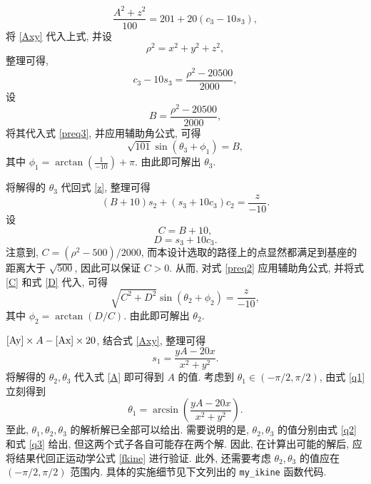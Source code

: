 \documentclass{article}
\begin{document}
\begin{equation}
    \frac{A^2+z^2}{100} = 201 + 20 (c_3 - 10s_3),
\end{equation}
将 \eqref{Axy} 代入上式, 并设
\begin{equation}
    \label{rho}
    \rho^2 = x^2 + y^2 + z^2,
\end{equation}
整理可得,
\begin{equation}
    \label{preq3}
    c_3 - 10s_3 = \frac{\rho^2 - 20500}{2000},
\end{equation}
设
\begin{equation}
    \label{B}
    B = \frac{\rho^2 - 20500}{2000},
\end{equation}
将其代入式 \eqref{preq3}, 并应用辅助角公式, 可得
\begin{equation}
    \label{q3}
    \sqrt{101}\sin(\theta_3 + \phi_1) = B,
\end{equation}
其中 $\phi_1 = \arctan(\frac{1}{-10}) + \pi$. 由此即可解出 $\theta_3$.\par
将解得的 $\theta_3$ 代回式 \eqref{z}, 整理可得
\begin{equation}
    \label{preq2}
    (B+10)s_2 + (s_3+10c_3)c_2 = \frac{z}{-10}.
\end{equation}
设
\begin{equation}
    \label{C}
    C = B + 10,
\end{equation}
\begin{equation}
    \label{D}
    D = s_3+10c_3.
\end{equation}
注意到, $C = (\rho^2 - 500)/2000$, 而本设计选取的路径上的点显然都满足到基座的距离大于 $\sqrt{500}$, 因此可以保证 $C > 0$. 从而, 对式 \eqref{preq2} 应用辅助角公式, 并将式 \eqref{C} 和式 \eqref{D} 代入, 可得
\begin{equation}
    \label{q2}
    \sqrt{C^2+D^2} \sin(\theta_2 + \phi_2) = \frac{z}{-10},
\end{equation}
其中 $\phi_2 = \arctan(D/C)$. 由此即可解出 $\theta_2$.\par
$\eqref{Ay} \times A - \eqref{Ax} \times 20$, 结合式 \eqref{Axy}, 整理可得
\begin{equation}
    \label{q1}
    s_1 = \frac{yA - 20x}{x^2+y^2}.
\end{equation}
将解得的 $\theta_2,\theta_3$ 代入式 \eqref{A} 即可得到 $A$ 的值. 考虑到 $\theta_1 \in (-\pi/2, \pi/2)$, 由式 \eqref{q1} 立刻得到
\begin{equation}
    \label{solvedq1}
    \theta_1 = \arcsin(\frac{yA - 20x}{x^2+y^2}).
\end{equation}
至此, $\theta_1,\theta_2,\theta_3$ 的解析解已全部可以给出. 需要说明的是, $\theta_2,\theta_3$ 的值分别由式 \eqref{q2} 和式 \eqref{q3} 给出, 但这两个式子各自可能存在两个解. 因此, 在计算出可能的解后, 应将结果代回正运动学公式 \eqref{fkine} 进行验证. 此外, 还需要考虑 $\theta_2,\theta_3$ 的值应在 $(-\pi/2,\pi/2)$ 范围内. 具体的实施细节见下文列出的 \verb|my_ikine| 函数代码.
\end{document}
